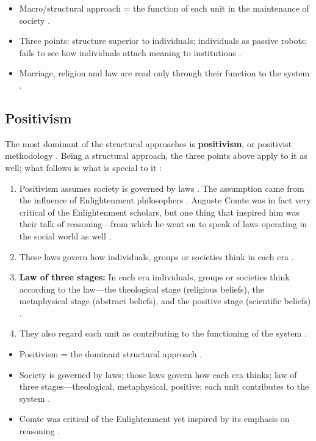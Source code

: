 \begin{QuickRevision}
\begin{itemize}
    \item Macro/structural approach = the function of each unit in the maintenance of society .
    \item Three points: structure superior to individuals; individuals as passive robots; fails to see how individuals attach meaning to institutions .
    \item Marriage, religion and law are read only through their function to the system .
\end{itemize}
\end{QuickRevision}

\subsection{Positivism}
The most dominant of the structural approaches is \textbf{positivism}, or positivist methodology . Being a structural approach, the three points above apply to it as well; what follows is what is special to it :
\begin{enumerate}
    \item Positivism assumes society is governed by laws . The assumption came from the influence of Enlightenment philosophers . Auguste Comte was in fact very critical of the Enlightenment scholars, but one thing that inspired him was their talk of reasoning---from which he went on to speak of laws operating in the social world as well .
    \item These laws govern how individuals, groups or societies think in each era .
    \item \textbf{Law of three stages:} In each era individuals, groups or societies think according to the law---the theological stage (religious beliefs), the metaphysical stage (abstract beliefs), and the positive stage (scientific beliefs) .
    \item They also regard each unit as contributing to the functioning of the system .
\end{enumerate}

\begin{QuickRevision}
\begin{itemize}
    \item Positivism = the dominant structural approach .
    \item Society is governed by laws; those laws govern how each era thinks; law of three stages---theological, metaphysical, positive; each unit contributes to the system .
    \item Comte was critical of the Enlightenment yet inspired by its emphasis on reasoning .
\end{itemize}
\end{QuickRevision}

